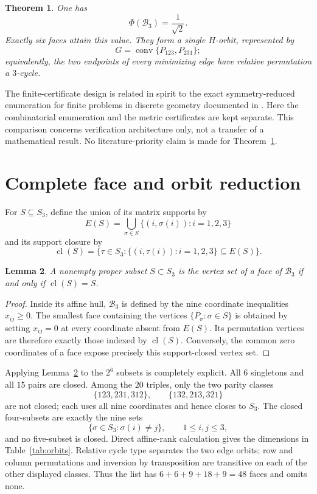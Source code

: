 \documentclass[11pt]{article}
\newtheorem{theorem}{Theorem}
\newtheorem{lemma}[theorem]{Lemma}
\DeclareMathOperator{\conv}{conv}
\begin{document}
\begin{theorem}\label{thm:main}
One has
\[
 \Phi(\mathcal B_3)=\frac1{\sqrt2}.
\]
Exactly six faces attain this value.  They form a single $H$-orbit,
represented by
\[
 G=\conv\{P_{123},P_{231}\};
\]
equivalently, the two endpoints of every minimizing edge have relative
permutation a $3$-cycle.
\end{theorem}

The finite-certificate design is related in spirit to the exact
symmetry-reduced enumeration for finite problems in discrete geometry
documented in \cite{ZengEtAl2026FiniteCertificates}.  Here the combinatorial
enumeration and the metric certificates are kept separate.  This comparison
concerns verification architecture only, not a transfer of a mathematical
result.  No literature-priority claim is made for Theorem~\ref{thm:main}.

\section{Complete face and orbit reduction}

For $S\subseteq S_3$, define the union of its matrix supports by
\[
 E(S)=\bigcup_{\sigma\in S}\{(i,\sigma(i)):i=1,2,3\}
\]
and its support closure by
\[
 \operatorname{cl}(S)=
 \{\tau\in S_3:\{(i,\tau(i)):i=1,2,3\}\subseteq E(S)\}.
\]

\begin{lemma}\label{lem:closure}
A nonempty proper subset $S\subset S_3$ is the vertex set of a face of
$\mathcal B_3$ if and only if $\operatorname{cl}(S)=S$.
\end{lemma}

\begin{proof}
Inside its affine hull, $\mathcal B_3$ is defined by the nine coordinate
inequalities $x_{ij}\geq0$.  The smallest face containing the vertices
$\{P_\sigma:\sigma\in S\}$ is obtained by setting $x_{ij}=0$ at every
coordinate absent from $E(S)$.  Its permutation vertices are therefore
exactly those indexed by $\operatorname{cl}(S)$.  Conversely, the common
zero coordinates of a face expose precisely this support-closed vertex set.
\end{proof}

Applying Lemma~\ref{lem:closure} to the $2^6$ subsets is completely
explicit.  All $6$ singletons and all $15$ pairs are closed.  Among the
$20$ triples, only the two parity classes
\[
 \{123,231,312\},\qquad \{132,213,321\}
\]
are not closed; each uses all nine coordinates and hence closes to $S_3$.
The closed four-subsets are exactly the nine sets
\[
 \{\sigma\in S_3:\sigma(i)\ne j\},\qquad 1\leq i,j\leq3,
\]
and no five-subset is closed.  Direct affine-rank calculation gives the
dimensions in Table~\ref{tab:orbits}.  Relative cycle type separates the two
edge orbits; row and column permutations and inversion by transposition are
transitive on each of the other displayed classes.  Thus the list has
$6+6+9+18+9=48$ faces and omits none.
\end{document}
